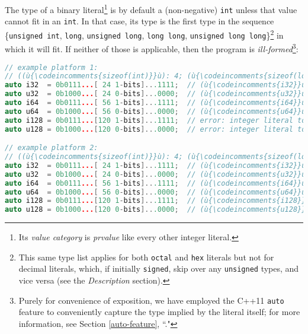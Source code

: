 \noindent The type of a binary literal{\cprotect\footnote{Its \emph{value
  category} is \emph{prvalue} like every other integer literal.}} is by
default a (non-negative) \texttt{int} unless that value cannot fit in an
\texttt{int}. In that case, its type is the first type in the sequence
\{\texttt{unsigned}~\texttt{int}, \texttt{long},
\texttt{unsigned}~\texttt{long}, \texttt{long}~\texttt{long},
\texttt{unsigned}~\texttt{long}~\texttt{long}\}{\cprotect\footnote{This
same type list applies for both \texttt{octal} and \texttt{hex}
literals but not for decimal literals, which, if initially
\texttt{signed}, skip over any \texttt{unsigned} types, and vice versa
  (see the \textit{Description} section).}} in which it will fit. If neither of those is applicable, then the program is
\emph{ill-formed}{\cprotect\footnote{Purely for convenience of
exposition, we have employed the C++11 \texttt{auto} feature to
conveniently capture the type implied by the literal itself; for more
  information, see Section \ref{auto-feature}, ``."}}:

\begin{lstlisting}[language=C++]
// example platform 1:
// ((ù{\codeincomments{sizeof(int)}}ù): 4; (ù{\codeincomments{sizeof(long)}}ù): 4; (ù{\codeincomments{sizeof(long long)}}ù): 8)
auto i32  = 0b0111...[ 24 1-bits]...1111;  // (ù{\codeincomments{i32}}ù) is (ù{\codeincomments{int}}ù).
auto u32  = 0b1000...[ 24 0-bits]...0000;  // (ù{\codeincomments{u32}}ù) is (ù{\codeincomments{unsigned int}}ù).
auto i64  = 0b0111...[ 56 1-bits]...1111;  // (ù{\codeincomments{i64}}ù) is (ù{\codeincomments{long long}}ù).
auto u64  = 0b1000...[ 56 0-bits]...0000;  // (ù{\codeincomments{u64}}ù) is (ù{\codeincomments{unsigned long long}}ù).
auto i128 = 0b0111...[120 1-bits]...1111;  // error: integer literal too large
auto u128 = 0b1000...[120 0-bits]...0000;  // error: integer literal too large

// example platform 2:
// ((ù{\codeincomments{sizeof(int)}}ù): 4; (ù{\codeincomments{sizeof(long)}}ù): 8; (ù{\codeincomments{sizeof(long long)}}ù): 16)
auto i32  = 0b0111...[ 24 1-bits]...1111;  // (ù{\codeincomments{i32}}ù)  is (ù{\codeincomments{int}}ù).
auto u32  = 0b1000...[ 24 0-bits]...0000;  // (ù{\codeincomments{u32}}ù)  is (ù{\codeincomments{unsigned int}}ù).
auto i64  = 0b0111...[ 56 1-bits]...1111;  // (ù{\codeincomments{i64}}ù)  is (ù{\codeincomments{long}}ù).
auto u64  = 0b1000...[ 56 0-bits]...0000;  // (ù{\codeincomments{u64}}ù)  is (ù{\codeincomments{unsigned long}}ù).
auto i128 = 0b0111...[120 1-bits]...1111;  // (ù{\codeincomments{i128}}ù) is (ù{\codeincomments{long long}}ù).
auto u128 = 0b1000...[120 0-bits]...0000;  // (ù{\codeincomments{u128}}ù) is (ù{\codeincomments{unsigned long long}}ù).
\end{lstlisting}
    

